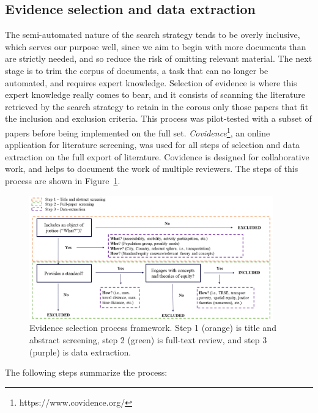 \documentclass[12pt, oneside]{report}
\begin{document}
\hypertarget{evidence-selection-and-data-extraction}{%
\subsection{Evidence selection and data
extraction}\label{evidence-selection-and-data-extraction}}

The semi-automated nature of the search strategy tends to be overly
inclusive, which serves our purpose well, since we aim to begin with
more documents than are strictly needed, and so reduce the risk of
omitting relevant material. The next stage is to trim the corpus of
documents, a task that can no longer be automated, and requires expert
knowledge. Selection of evidence is where this expert knowledge really
comes to bear, and it consists of scanning the literature retrieved by
the search strategy to retain in the corous only those papers that fit
the inclusion and exclusion criteria. This process was pilot-tested with
a subset of papers before being implemented on the full set.
\emph{Covidence}\footnote{https://www.covidence.org/}, an online
application for literature screening, was used for all steps of
selection and data extraction on the full export of literature.
Covidence is designed for collaborative work, and helps to document the
work of multiple reviewers. The steps of this process are shown in
Figure~\ref{fig-fig1}.

\begin{figure}

{\centering \includegraphics[width=4.15in,height=\textheight]{figures/Methods_framework.png}

}

\caption{\label{fig-fig1}Evidence selection process framework. Step 1
(orange) is title and abstract screening, step 2 (green) is full-text
review, and step 3 (purple) is data extraction.}

\end{figure}

The following steps summarize the process:
\end{document}
